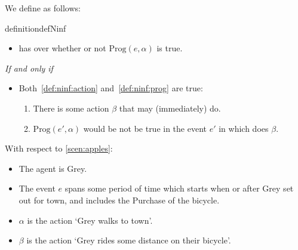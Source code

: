 \begin{note}
  We define \ninf{} as follows:
  \begin{restatable}[\ninf{2}]{definition}{defNinf}
    \label{def:ninf}

    \begin{itemize}
    \item
      \vAgent{} has \ninf{} over whether or not \(\text{Prog}(e, \alpha)\) is true.
    \end{itemize}

    \emph{If and only if}

    \begin{itemize}
    \item
      Both~\ref{def:ninf:action} and~\ref{def:ninf:prog} are true:
      \begin{enumerate}[label=\alph*., ref=(\alph*)]
      \item
        \label{def:ninf:action}
        There is some action \(\beta\) that \vAgent{} may (immediately) do.
      \item
        \label{def:ninf:prog}
        \(\text{Prog}(e', \alpha)\) would be not be true in the event \(e'\) in which \vAgent{} does \(\beta\).
      \end{enumerate}
    \end{itemize}
    \vspace{-\baselineskip}
  \end{restatable}

  With respect to \autoref{scen:apples}:

  \begin{itemize}[noitemsep]
  \item
    The agent is Grey.
  \item
    The event \(e\) spans some period of time which starts when or after Grey set out for town, and includes the Purchase of the bicycle.
  \item
    \(\alpha\) is the action `Grey walks to town'.
  \item
    \(\beta\) is the action `Grey rides some distance on their bicycle'.
  \end{itemize}
\end{note}

